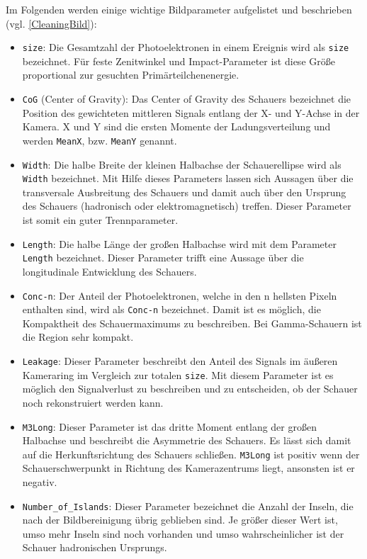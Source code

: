 Im Folgenden werden einige wichtige Bildparameter aufgelistet und beschrieben (vgl. \autoref{CleaningBild}):

\begin{itemize}
 \item \texttt{size}: Die Gesamtzahl der Photoelektronen in einem Ereignis wird als \texttt{size} bezeichnet. Für feste Zenitwinkel und Impact-Parameter ist diese Größe proportional zur gesuchten Primärteilchenenergie.
 \item \texttt{CoG} (Center of Gravity): Das Center of Gravity des Schauers bezeichnet die Position des gewichteten mittleren Signals entlang der X- und Y-Achse in der Kamera. 
 X und Y sind die ersten Momente der Ladungsverteilung und werden \texttt{MeanX}, bzw. \texttt{MeanY} genannt.
 \item \texttt{Width}: Die halbe Breite der kleinen Halbachse der Schauerellipse wird als \texttt{Width} bezeichnet. 
 Mit Hilfe dieses Parameters lassen sich Aussagen über die transversale Ausbreitung des Schauers und damit auch über den Ursprung des Schauers (hadronisch oder elektromagnetisch) treffen. 
 Dieser Parameter ist somit ein guter Trennparameter.
 \item \texttt{Length}: Die halbe Länge der großen Halbachse wird mit dem Parameter \texttt{Length} bezeichnet.
 Dieser Parameter trifft eine Aussage über die longitudinale Entwicklung des Schauers.
 \item \texttt{Conc-n}: Der Anteil der Photoelektronen, welche in den n hellsten Pixeln enthalten sind, wird als \texttt{Conc-n} bezeichnet.
 Damit ist es möglich, die Kompaktheit des Schauermaximums zu beschreiben. 
 Bei Gamma-Schauern ist die Region sehr kompakt.
 \item \texttt{Leakage}: Dieser Parameter beschreibt den Anteil des Signals im äußeren Kameraring im Vergleich zur totalen \texttt{size}.
 Mit diesem Parameter ist es möglich den Signalverlust zu beschreiben und zu entscheiden, ob der Schauer noch rekonstruiert werden kann.
 \item \texttt{M3Long}: Dieser Parameter ist das dritte Moment entlang der großen Halbachse und beschreibt die Asymmetrie des Schauers.
 Es lässt sich damit auf die Herkunftsrichtung des Schauers schließen. 
 \texttt{M3Long} ist positiv wenn der Schauerschwerpunkt in Richtung des Kamerazentrums liegt, ansonsten ist er negativ.
 \item \texttt{Number\_of\_Islands}: Dieser Parameter bezeichnet die Anzahl der Inseln, die nach der Bildbereinigung übrig geblieben sind. 
 Je größer dieser Wert ist, umso mehr Inseln sind noch vorhanden und umso wahrscheinlicher ist der Schauer hadronischen Ursprungs.
\end{itemize}

